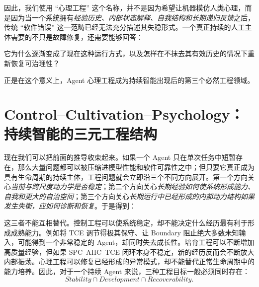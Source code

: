 因此，我们使用 ``心理工程'' 这个名称，并不是因为希望让机器模仿人类心理，而是因为当一个系统拥有\emph{经验历史、内部状态解释、自我结构和长期递归反馈}之后，传统 ``软件错误'' 这一范畴已经无法充分描述其失稳形式。一个真正持续的人工主体需要的不只是故障修复，还需要能够回答：
\begin{statementbox}
它为什么逐渐变成了现在这种运行方式，以及怎样在不抹去其有效历史的情况下重新恢复可治理性？
\end{statementbox}
正是在这个意义上，Agent 心理工程成为持续智能出现后的第三个必然工程领域。

\section{Control--Cultivation--Psychology：持续智能的三元工程结构}

现在我们可以把前面的推导收束起来。如果一个 Agent 只在单次任务中短暂存在，那么大量问题都可以被压缩进模型性能和软件可靠性之中；但只要它真正成为具有生命周期的持续主体，工程问题就会立即沿三个不同方向展开。第一个方向关心\emph{当前与跨尺度动力学是否稳定}；第二个方向关心\emph{长期经验如何使系统形成能力、自我和更大的自治空间}；第三个方向关心\emph{长期运行中已经形成的内部动力结构如果发生失衡，应如何诊断和恢复}。于是得到：
\begin{statementbox}
\centering
{}
\end{statementbox}
\begin{statementbox}
\centering
{}
\end{statementbox}
\begin{statementbox}
\centering
{}
\end{statementbox}

这三者不能互相替代。控制工程可以使系统稳定，却不能决定什么经历最有利于形成成熟能力。例如将 TCE 调节得极其保守、让 Boundary 阻止绝大多数未知输入，可能得到一个非常稳定的 Agent，却同时失去成长性。培育工程可以不断增加高质量经验，但如果 SPC--AHC--TCE 闭环本身不稳定，新的经历反而会不断放大内部振荡。心理工程可以修复已经形成的异常模式，却不能替代正常生命周期中的能力培养。因此，对于一个持续 Agent 来说，三种工程目标一般必须同时存在：
\[
\boxed{
Stability
\cap
Development
\cap
Recoverability.
}
\]

